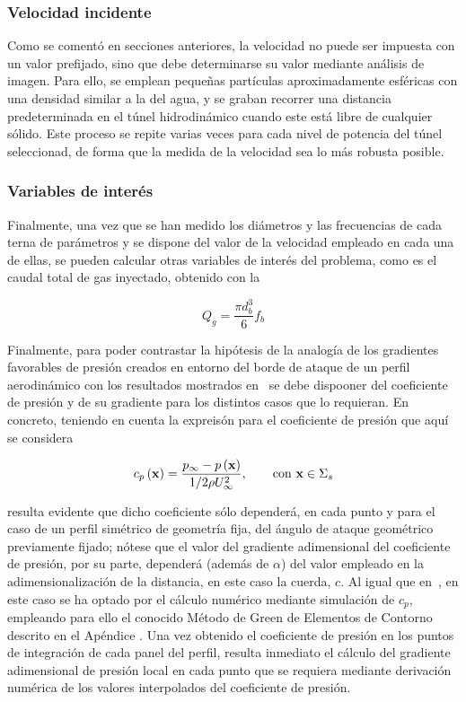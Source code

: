 \subsubsection*{Velocidad incidente}

Como se comentó en secciones anteriores, la velocidad no puede ser impuesta con un valor prefijado, sino que debe determinarse su valor mediante análisis de imagen. Para ello, se emplean pequeñas partículas aproximadamente esféricas con una densidad similar a la del agua, y se graban recorrer una distancia predeterminada en el túnel hidrodinámico cuando este está libre de cualquier sólido. Este proceso se repite varias veces para cada nivel de potencia del túnel seleccionad, de forma que la medida de la velocidad sea lo más robusta posible. 

\subsubsection*{Variables de interés}

Finalmente, una vez que se han medido los diámetros y las frecuencias de cada terna de parámetros y se dispone del valor de la velocidad empleado en cada una de ellas, se pueden calcular otras variables de interés del problema, como es el caudal total de gas inyectado, obtenido con la 

\begin{displaymath}
Q_{g}  = \dfrac{\pi d_{b}^{3}}{6}f_{b}
\end{displaymath}

Finalmente, para poder contrastar la hipótesis de la analogía de los gradientes favorables de presión creados en entorno del borde de ataque de un perfil aerodinámico con los resultados mostrados en~\cite{Evangelio2015} se debe dispooner del coeficiente de presión y de su gradiente para los distintos casos que lo requieran. En concreto, teniendo en cuenta la expreisón para el coeficiente de presión que aquí se considera

\begin{equation}
c_{p}\left(\mathbf{x}\right) = \dfrac{p_{\infty} - p\left(\mathbf{x}\right)}{1/2\rho U_{\infty}^{2}},\qquad \mathrm{con} \ \mathbf{x} \in \Sigma_{s}
\LABEQ{cp2D}
\end{equation}

resulta evidente que dicho coeficiente sólo dependerá, en cada punto y  para el caso de un perfil simétrico de geometría fija, del ángulo de ataque geométrico previamente fijado; nótese que el valor del gradiente adimensional del coeficiente de presión, por su parte, dependerá (además de $\alpha$) del  valor empleado en la adimensionalización de la distancia, en este caso la cuerda, $c$. Al igual que en~\cite{Evangelio2015}, en este caso se ha optado por el cálculo numérico mediante simulación de $c_{p}$, empleando para ello el conocido Método de Green de Elementos de Contorno descrito en el Apéndice %
. Una vez obtenido el coeficiente de presión en los puntos de integración de cada panel del perfil, resulta inmediato el cálculo del gradiente adimensional de presión local en cada punto que se requiera mediante derivación numérica de los valores interpolados del coeficiente de presión. 


